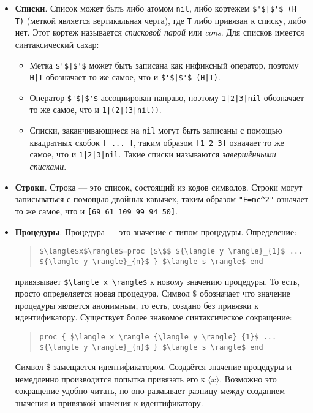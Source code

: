 \begin{itemize}
\item{\textbf{Списки}. Список может быть либо атомом \lstinline|nil|, либо кортежем  \lstinline!$'$|$'$ (H T)! (меткой является вертикальная черта), где \lstinline|T| либо привязан к списку, либо нет. Этот кортеж называется \emph{списковой парой} или \emph{cons}. Для списков имеется синтаксический сахар:

  \begin{itemize}
  \item{Метка  \lstinline!$'$|$'$!  может быть записана как инфиксный оператор, поэтому \lstinline!H|T! обозначает то же самое, что и  \lstinline!$'$|$'$ (H|T)!.}
    
  \item{Оператор  \lstinline!$'$|$'$!  ассоциирован направо, поэтому \lstinline!1|2|3|nil! обозначает то же самое, что и \lstinline!1|(2|(3|nil))!.}
    
\item{Списки, заканчивающиеся на \lstinline|nil| могут быть записаны с помощью квадратных скобок \lstinline|[ ... ]|, таким образом \lstinline|[1 2 3]| означает то же самое, что и \lstinline!1|2|3|nil!. Такие списки называются \emph{завершёнными списками}.}
  \end{itemize}}
  
\item{\textbf{Строки}. Строка --- это список, состоящий из кодов символов. Строки могут записываться с помощью двойных кавычек, таким образом \lstinline|"E=mc^2"| означает то же самое, что и \lstinline|[69 61 109 99 94 50]|.}

\item{\textbf{Процедуры}. Процедура --- это значение с типом процедуры. Определение:

  \begin{quote}
    \lstinline|$\langle$x$\rangle$=proc {$\$$ ${\langle y \rangle}_{1}$ ... ${\langle y \rangle}_{n}$ } $\langle s \rangle$ end|
  \end{quote}
  
привязывает \lstinline|$\langle x \rangle$| к новому значению процедуры. То есть, просто определяется новая процедура. Символ $\$$ обозначает что значение процедуры является анонимным, то есть, создано без привязки к идентификатору. Существует более знакомое синтаксическое сокращение:

\begin{quote}
  \lstinline|proc { $\langle x \rangle {\langle y \rangle}_{1}$ ... ${\langle y \rangle}_{n}$ } $\langle s \rangle$ end|
\end{quote}

Символ $\$$ замещается идентификатором. Создаётся значение процедуры и немедленно производится попытка привязать его к $\langle x \rangle$. Возможно это сокращение удобно читать, но оно размывает разницу между созданием значения и привязкой значения к идентификатору.}
\end{itemize}

